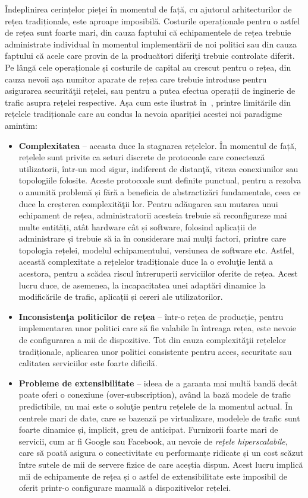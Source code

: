 Îndeplinirea cerințelor pieței în momentul de față, cu ajutorul arhitecturilor de rețea tradiționale, este aproape imposibilă. Costurile operaționale pentru o astfel de rețea sunt foarte mari, din cauza faptului că echipamentele de rețea trebuie administrate individual în momentul implementării de noi politici sau din cauza faptului că acele care provin de la producători diferiţi trebuie controlate diferit. Pe lângă cele operaționale și costurile de capital au crescut pentru o rețea, din cauza nevoii așa numitor aparate de rețea care trebuie introduse pentru asigurarea securităţii rețelei, sau pentru a putea efectua operații de inginerie de trafic asupra rețelei respective. Așa cum este ilustrat în~\cite{ome2012software}, printre limitările din rețelele tradiționale care au condus la nevoia apariției acestei noi paradigme amintim:
\begin{itemize}
	\item \textbf{Complexitatea} – aceasta duce la stagnarea rețelelor. În momentul de față, rețelele sunt privite ca seturi discrete de protocoale care conectează utilizatorii, într-un mod sigur, indiferent de distanţă, viteza conexiunilor sau topologiile folosite. Aceste protocoale sunt definite punctual, pentru a rezolva o anumită problemă și fără a beneficia de abstractizări fundamentale, ceea ce duce la creșterea complexităţii lor. Pentru adăugarea sau mutarea unui echipament de rețea, administratorii acesteia trebuie să reconfigureze mai multe entități, atât hardware cât și software, folosind aplicații de administrare și trebuie să ia în considerare mai mulți factori, printre care topologia rețelei, modelul echipamentului, versiunea de software etc. Astfel, această complexitate a rețelelor tradiționale duce la o evoluţie lentă a acestora, pentru a scădea riscul întreruperii serviciilor oferite de rețea. Acest lucru duce, de asemenea, la incapacitatea unei adaptări dinamice la modificările de trafic, aplicații și cereri ale utilizatorilor.
	\item \textbf{Inconsistenţa politicilor de rețea} – într-o rețea de producție, pentru implementarea unor politici care să fie valabile în întreaga rețea, este nevoie de configurarea a mii de dispozitive. Tot din cauza complexităţii rețelelor tradiționale, aplicarea unor politici consistente pentru acces, securitate sau calitatea serviciilor este foarte dificilă.
	\item \textbf{Probleme de extensibilitate} – ideea de a garanta mai multă bandă decât poate oferi o conexiune (over-subscription), având la bază modele de trafic predictibile, nu mai este o soluţie pentru rețelele de la momentul actual. În centrele mari de date, care se bazează pe virtualizare, modelele de trafic sunt foarte dinamice și, implicit, greu de anticipat. Furnizorii foarte mari de servicii, cum ar fi Google sau Facebook, au nevoie de \textit{rețele hiperscalabile}, care să poată asigura o conectivitate cu performanțe ridicate și un cost scăzut între sutele de mii de servere fizice de care aceștia dispun. Acest lucru implică mii de echipamente de rețea și o astfel de extensibilitate este imposibil de oferit printr-o configurare manuală a dispozitivelor rețelei. 

\end{itemize}
